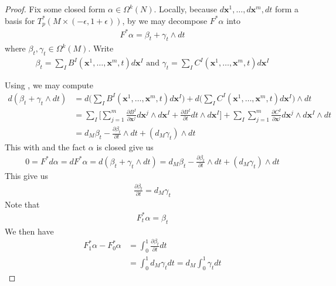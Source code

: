 \documentclass{report}
\begin{document}
\begin{proof}
Fix some closed form $\alpha \in \Omega^k(N)$. Locally, because $d\textbf{x}^1,\dots ,d\textbf{x}^m,dt$ form a basis for $T_p^*(M\times (-\epsilon , 1+\epsilon ) )$, by  we may decompose $F^* \alpha $ into 
\begin{align*}
F^* \alpha  = \beta_t + \gamma_t \wedge  dt 
\end{align*}
where $\beta _t,\gamma _t\in \Omega^k (M)$. Write 
\begin{align*}
\beta _t= \sum_I B^I (\textbf{x}^1,\dots ,\textbf{x}^m,t)d\textbf{x}^I \text{ and } \gamma _t= \sum_I C^I (\textbf{x}^1,\dots ,\textbf{x}^m,t)d\textbf{x}^I
\end{align*}

Using , we may compute 
\begin{align*}
d(\beta _t + \gamma_t \wedge  dt )&=  d\Big( \sum_I B^I(\textbf{x}^1,\dots ,\textbf{x}^m,t)d\textbf{x}^I \Big) + d \Big(\sum_I C^I (\textbf{x}^1,\dots ,\textbf{x}^m,t)d\textbf{x}^I \Big) \wedge  dt  \\
&= \sum_I \Big[\sum_{j=1}^m \frac{ \partial B^I}{\partial \textbf{x}^j} d\textbf{x}^j \wedge    d\textbf{x}^I + \frac{\partial B^I}{\partial t}dt \wedge  d\textbf{x}^I    \Big] + \sum_I \sum_{j=1}^m \frac{\partial C^I}{\partial \textbf{x}^j}d\textbf{x}^j \wedge  d\textbf{x}^I \wedge  dt   \\
&= d_M \beta_t - \frac{\partial \beta _t}{\partial t} \wedge  dt+  (d_M \gamma_t) \wedge  dt 
\end{align*}
This with  and the fact $\alpha $ is closed give us 
\begin{align*}
0=F^* d\alpha =dF^* \alpha = d(\beta _t + \gamma_t \wedge  dt ) =d_M\beta_t - \frac{\partial \beta _t}{\partial t}\wedge  dt + (d_M \gamma _t )\wedge  dt   
\end{align*}
This give us 
\begin{align*}
\frac{\partial \beta _t}{\partial t}= d_M \gamma_t
\end{align*}
Note that 
\begin{align*}
  F_t^* \alpha = \beta _t
\end{align*}
We then have 
\begin{align*}
  F_1^* \alpha -F_0^{*}\alpha &= \int_0^1 \frac{\partial \beta_t }{\partial t}dt \\
  &=\int_0^1 d_M \gamma_t dt =d_M \int_0^1 \gamma_t dt
\end{align*}
\end{proof}
\end{document}
